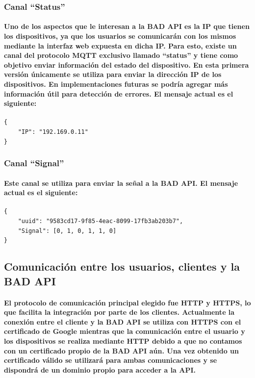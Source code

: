 \documentclass{article}
\begin{document}
\subsubsection{Canal “Status”}
\paragraph{
Uno de los aspectos que le interesan a la BAD API es la IP que tienen los dispositivos, ya que los usuarios se comunicarán con los mismos mediante la interfaz web expuesta en dicha IP. Para esto, existe un canal del protocolo MQTT exclusivo llamado “status” y tiene como objetivo enviar información del estado del dispositivo. En esta primera versión únicamente se utiliza para enviar la dirección IP de los dispositivos. En implementaciones futuras se podría agregar más información útil para detección de errores. El mensaje actual es el siguiente:
}
\begin{verbatim}
{
    "IP": "192.169.0.11"
}
\end{verbatim}

\subsubsection{Canal “Signal”}
\paragraph{
Este canal se utiliza para enviar la señal a la BAD API. El mensaje actual es el siguiente:
}
\begin{verbatim}
{
    "uuid": "9583cd17-9f85-4eac-8099-17fb3ab203b7",
    "Signal": [0, 1, 0, 1, 1, 0]
}
\end{verbatim}

\subsection{Comunicación entre los usuarios, clientes y la BAD API}
\paragraph{
El protocolo de comunicación principal elegido fue HTTP y HTTPS, lo que facilita la integración por parte de los clientes. Actualmente la conexión entre el cliente y la BAD API se utiliza con HTTPS con el certificado de Google mientras que la comunicación entre el usuario y los dispositivos se realiza mediante HTTP debido a que no contamos con un certificado propio de la BAD API aún. Una vez obtenido un certificado válido se utilizará para ambas comunicaciones y se dispondrá de un dominio propio para acceder a la API.
}
\end{document}
